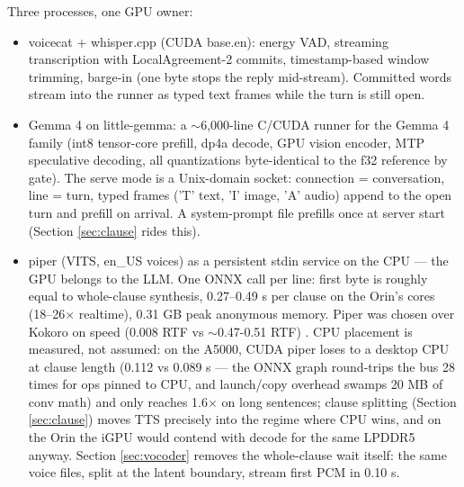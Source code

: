 \documentclass{article}
\begin{document}
Three processes, one GPU owner:

\begin{itemize}
	\item voicecat + whisper.cpp (CUDA base.en): energy VAD, streaming transcription with LocalAgreement-2 commits, timestamp-based window trimming, barge-in (one byte stops the reply mid-stream). Committed words stream into the runner as typed text frames while the turn is still open.
	\item Gemma 4 on little-gemma: a $\sim$6,000-line C/CUDA runner for the Gemma 4 family (int8 tensor-core prefill, dp4a decode, GPU vision encoder, MTP speculative decoding, all quantizations byte-identical to the f32 reference by gate). The serve mode is a Unix-domain socket: connection = conversation, line = turn, typed frames ('T' text, 'I' image, 'A' audio) append to the open turn and prefill on arrival. A system-prompt file prefills once at server start (Section \ref{sec:clause} rides this).
	\item piper (VITS, en\_US voices) as a persistent stdin service on the CPU — the GPU belongs to the LLM. One ONNX call per line: first byte is roughly equal to whole-clause synthesis, 0.27–0.49 s per clause on the Orin's cores (18–26× realtime), 0.31 GB peak anonymous memory. Piper was chosen over Kokoro on speed (0.008 RTF vs $\sim$0.47-0.51 RTF) \citep{codesotatts}. CPU placement is measured, not assumed: on the A5000, CUDA piper loses to a desktop CPU at clause length (0.112 vs 0.089 s — the ONNX graph round-trips the bus 28 times for ops pinned to CPU, and launch/copy overhead swamps 20 MB of conv math) and only reaches 1.6× on long sentences; clause splitting (Section \ref{sec:clause}) moves TTS precisely into the regime where CPU wins, and on the Orin the iGPU would contend with decode for the same LPDDR5 anyway. Section \ref{sec:vocoder} removes the whole-clause wait itself: the same voice files, split at the latent boundary, stream first PCM in 0.10 s.
\end{itemize}
\end{document}

